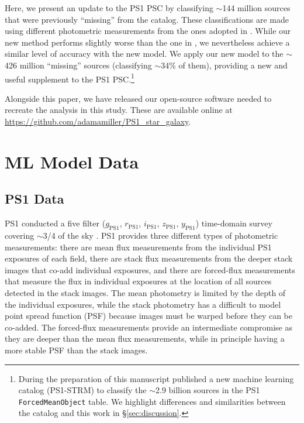 \documentclass[twocolumn]{aastex63}
\begin{document}
Here, we present an update to the PS1 PSC by classifying $\sim$144 million
sources that were previously ``missing'' from the catalog. These
classifications are made using different photometric measurements from the
ones adopted in \citet{Tachibana18}. While our new method performs slightly
worse than the one in \citet{Tachibana18}, we nevertheless achieve a similar
level of accuracy with the new model. We apply our new model to the $\sim$426
million ``missing'' sources (classifying $\sim$34\% of them), providing a new
and useful supplement to the PS1 PSC.\footnote{During the preparation of this
manuscript \citet{Beck20} published a new machine learning catalog (PS1-STRM)
to classify the $\sim$2.9 billion sources in the PS1 \texttt{ForcedMeanObject}
table. We highlight differences and similarities between the
\citeauthor{Beck20} catalog and this work in \S\ref{sec:discussion}.}

Alongside this paper, we have released our open-source software needed to
recreate the analysis in this study. These are available online at
\url{https://github.com/adamamiller/PS1_star_galaxy}.

\section{ML Model Data}

\subsection{PS1 Data}

PS1 conducted a five filter ($g_\mathrm{PS1}$, $r_\mathrm{PS1}$,
$i_\mathrm{PS1}$, $z_\mathrm{PS1}$, $y_\mathrm{PS1}$) time-domain survey
covering $\sim$3/4 of the sky \citep{Chambers16}. PS1 provides three different
types of photometric measurements: there are mean flux measurements from the
individual PS1 exposures of each field, there are stack flux measurements from
the deeper stack images that co-add individual exposures, and there are
forced-flux measurements that measure the flux in individual exposures at the
location of all sources detected in the stack images. The mean photometry is
limited by the depth of the individual exposures, while the stack photometry
has a difficult to model point spread function (PSF) because images must be
warped before they can be co-added. The forced-flux measurements provide an
intermediate compromise as they are deeper than the mean flux measurements,
while in principle having a more stable PSF than the stack images.
\end{document}
